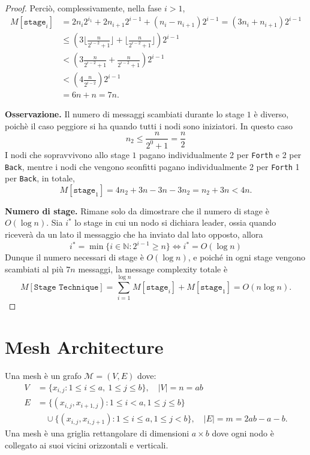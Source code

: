 \begin{teorema}
\begin{proof}
        Perciò, complessivamente, nella fase $i > 1$,
        \begin{align*}
            M[\texttt{stage}_i] 
            &= 2n_i2^{i_1} + 2n_{i+1}2^{i-1} + (n_i - n_{i+1})2^{i-1} = (3n_i + n_{i+1})2^{i-1} \\
            &\leq \left( 3 \bigg\lfloor \frac{n}{2^{i-2} + 1} \bigg\rfloor + \bigg\lfloor \frac{n}{2^{i-2} + 1} \bigg\rfloor \right)2^{i-1} \\
            &< \left( 3  \frac{n}{2^{i-2} + 1} + \frac{n}{2^{i-2} + 1} \right)2^{i-1} \\
            &< \left( 4  \frac{n}{2^{i-2}} \right)2^{i-1} \\
            &= 6n + n = 7n.
        \end{align*}
        
        \textbf{Osservazione.} Il numero di messaggi scambiati durante lo stage $1$ è diverso, poichè il caso peggiore si ha quando tutti i nodi sono iniziatori. In questo caso 
        \[
            n_2 \leq \frac{n}{2^0 + 1} = \frac{n}{2}
        \]
        I nodi che sopravvivono allo stage $1$ pagano individualmente 2 per \texttt{Forth} e 2 per \texttt{Back}, mentre i nodi che vengono sconfitti pagano individualmente 2 per \texttt{Forth} 1 per \texttt{Back}, in totale,
        \[
            M[\texttt{stage}_1] = 4n_2 + 3n - 3n - 3n_2 = n_2 + 3n < 4n.
        \]

        \textbf{Numero di stage.} Rimane solo da dimostrare che il numero di stage è $O(\log n)$. Sia $i^*$ lo stage in cui un nodo si dichiara leader, ossia quando riceverà da un lato il messaggio che ha inviato dal lato opposto, allora
        \[
            i^* = \min \{i \in \mathbb{N} : 2^{i-1} \geq n\} \iff i^* = O(\log n)
        \]
        Dunque il numero necessari di stage è $O(\log n)$, e poiché in ogni stage vengono scambiati al più $7n$ messaggi, la message complexity totale è
        \[
            M[\texttt{Stage Technique}] = \sum_{i=1}^{\log n} M[\texttt{stage}_i] + M[\texttt{stage}_1] = O(n \log n).
        \]
    \end{proof}
\end{teorema}

\newpage

\section{Mesh Architecture}
\begin{definizione}[Mesh]
    Una mesh è un grafo $\mathcal{M} = (V, E)$ dove:
    \begin{align*}
        V &= \{x_{i,j} : 1 \leq i \leq a,\ 1 \leq j \leq b\}, \quad |V| = n = ab \\
        E &= \{(x_{i,j}, x_{i+1,j}) : 1 \leq i < a, 1 \leq j \leq b\} \\
          &\quad \cup \{(x_{i,j}, x_{i,j+1}) : 1 \leq i \leq a, 1 \leq j < b\}, \quad |E| = m = 2ab - a - b.
    \end{align*}
    Una mesh è una griglia rettangolare di dimensioni $a \times b$ dove ogni nodo è collegato ai suoi vicini orizzontali e verticali.
\end{definizione}


